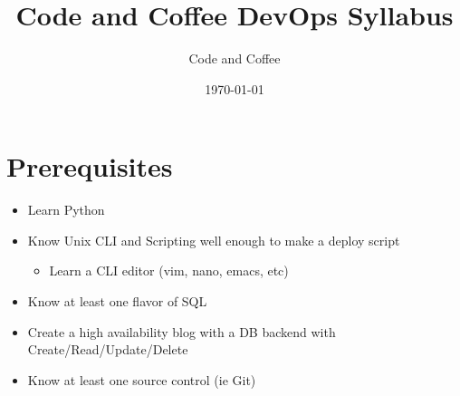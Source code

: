\documentclass[12pt]{article}
\title{Code and Coffee DevOps Syllabus}
\author{Code and Coffee}
\date{\today}
\begin{document}
\maketitle

\section{Prerequisites}
\begin{itemize}
\item Learn Python
\item Know Unix CLI and Scripting well enough to make a deploy script
  \begin{itemize}
  \item Learn a CLI editor (vim, nano, emacs, etc)
  \end{itemize}
\item Know at least one flavor of SQL
\item Create a high availability blog with a DB backend with
  Create/Read/Update/Delete
\item Know at least one source control (ie Git)
\end{itemize}
\end{document}
